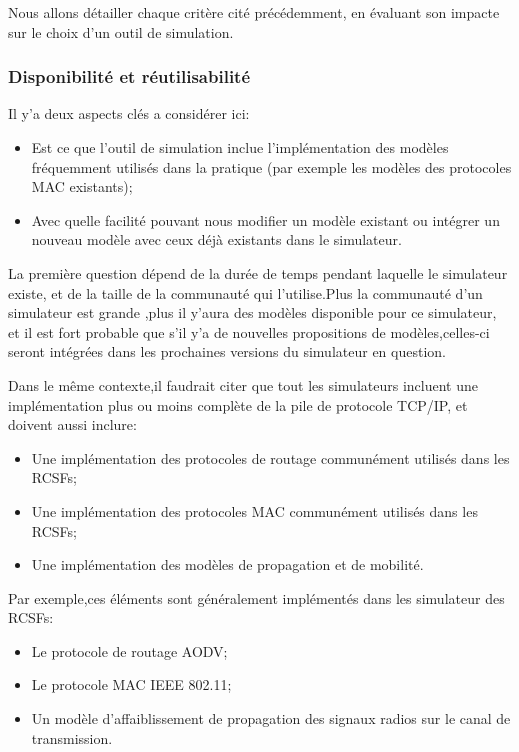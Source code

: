Nous allons détailler chaque critère cité précédemment, en évaluant son impacte sur le choix d'un outil de simulation.

\subsubsection{Disponibilité et réutilisabilité}
Il y'a deux aspects clés a considérer ici:
\begin{itemize}
\item Est ce que l'outil de simulation inclue l'implémentation des modèles fréquemment utilisés dans la pratique (par exemple les modèles des protocoles MAC existants);
\item Avec quelle facilité pouvant nous modifier un modèle existant ou intégrer un nouveau modèle avec ceux déjà existants dans le simulateur.
\end{itemize}

La première question dépend de la durée de temps pendant laquelle le simulateur existe, et de la taille de la communauté qui l'utilise.Plus la communauté d'un simulateur est grande ,plus il y'aura des modèles disponible pour ce simulateur, et il est fort probable que s'il y'a de nouvelles propositions de modèles,celles-ci seront intégrées dans les prochaines versions du simulateur en question.

Dans le même contexte,il faudrait citer que tout les simulateurs incluent une implémentation plus ou moins complète de la pile de protocole TCP/IP, et doivent aussi inclure:
\begin{itemize}
\item Une implémentation des protocoles de routage communément utilisés dans les RCSFs;
\item Une implémentation des protocoles MAC communément utilisés  dans les RCSFs;
\item Une implémentation des modèles de propagation et de mobilité.
\end{itemize}

Par exemple,ces éléments sont généralement implémentés dans les simulateur des RCSFs:
\begin{itemize}
\item Le protocole de routage AODV;
\item Le protocole MAC IEEE 802.11;
\item Un modèle d'affaiblissement de propagation des signaux radios sur le canal de transmission.

\end{itemize}

